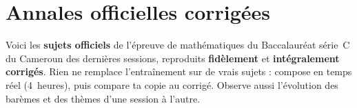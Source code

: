 \chapter{Annales officielles corrigées}

\noindent Voici les \textbf{sujets officiels} de l'épreuve de mathématiques du
Baccalauréat série~C du Cameroun des dernières sessions, reproduits \textbf{fidèlement}
et \textbf{intégralement corrigés}. Rien ne remplace l'entraînement sur de vrais sujets :
compose en temps réel (4~heures), puis compare ta copie au corrigé. Observe aussi
l'évolution des barèmes et des thèmes d'une session à l'autre.


\clearpage

\clearpage

\clearpage

